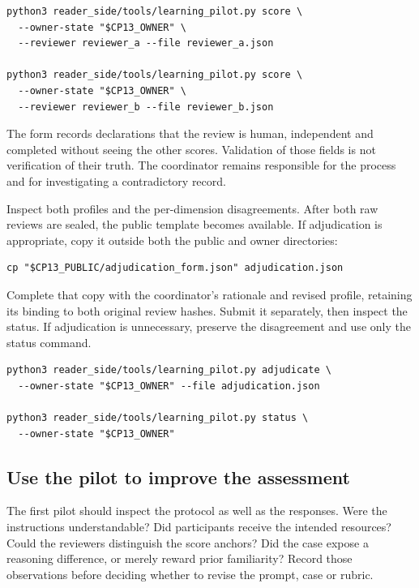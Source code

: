 \begin{lstlisting}
python3 reader_side/tools/learning_pilot.py score \
  --owner-state "$CP13_OWNER" \
  --reviewer reviewer_a --file reviewer_a.json

python3 reader_side/tools/learning_pilot.py score \
  --owner-state "$CP13_OWNER" \
  --reviewer reviewer_b --file reviewer_b.json
\end{lstlisting}

The form records declarations that the review is human, independent and completed without seeing the other scores. Validation of those fields is not verification of their truth. The coordinator remains responsible for the process and for investigating a contradictory record.

Inspect both profiles and the per-dimension disagreements. After both raw reviews are sealed, the public  template becomes available. If adjudication is appropriate, copy it outside both the public and owner directories:

\Needspace{5\baselineskip}
\begin{lstlisting}
cp "$CP13_PUBLIC/adjudication_form.json" adjudication.json
\end{lstlisting}

Complete that copy with the coordinator's rationale and revised profile, retaining its binding to both original review hashes. Submit it separately, then inspect the status. If adjudication is unnecessary, preserve the disagreement and use only the status command.

\begin{lstlisting}
python3 reader_side/tools/learning_pilot.py adjudicate \
  --owner-state "$CP13_OWNER" --file adjudication.json

python3 reader_side/tools/learning_pilot.py status \
  --owner-state "$CP13_OWNER"
\end{lstlisting}

\subsection{Use the pilot to improve the assessment}

The first pilot should inspect the protocol as well as the responses. Were the instructions understandable? Did participants receive the intended resources? Could the reviewers distinguish the score anchors? Did the case expose a reasoning difference, or merely reward prior familiarity? Record those observations before deciding whether to revise the prompt, case or rubric.

